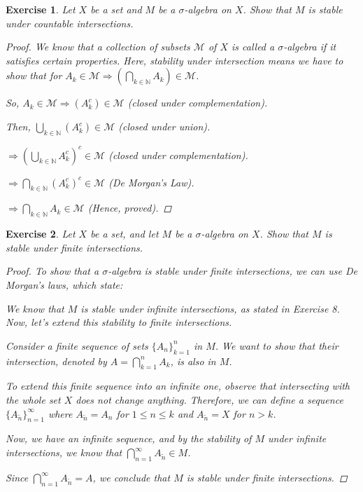 \documentclass{article}
\newtheorem{exercise}{Exercise}
\begin{document}
    \begin{exercise}
    Let $X$ be a set and $M$ be a $\sigma$-algebra on $X$. Show that $M$ is stable under countable intersections.

    \begin{proof}
        We know that a collection of subsets $\mathcal{M}$ of $X$ is called a $\sigma$-algebra if it satisfies certain properties. Here, stability under intersection means we have to show that for $A_k \in \mathcal{M} \Rightarrow \left(\bigcap_{k\in\mathbb{N}} A_k\right) \in \mathcal{M}$.

So, $A_k \in \mathcal{M} \Rightarrow (A_k^c) \in \mathcal{M}$ (closed under complementation).

Then, $\bigcup_{k\in\mathbb{N}} (A_k^c) \in \mathcal{M}$ (closed under union).

$\Rightarrow \left(\bigcup_{k\in\mathbb{N}} A_k^c\right)^c \in \mathcal{M}$ (closed under complementation).

$\Rightarrow \bigcap_{k\in\mathbb{N}} (A_k^c)^c \in \mathcal{M}$ (De Morgan's Law).

$\Rightarrow \bigcap_{k\in\mathbb{N}} A_k \in \mathcal{M}$ (Hence, proved).
    \end{proof}
        
    \end{exercise}

    \begin{exercise}
        Let $X$ be a set, and let $M$ be a $\sigma$-algebra on $X$. Show that $M$ is stable under finite intersections.

    \begin{proof}
        To show that a $\sigma$-algebra is stable under finite intersections, we can use De Morgan's laws, which state:

We know that \(M\) is stable under infinite intersections, as stated in Exercise 8. Now, let's extend this stability to finite intersections.

Consider a finite sequence of sets \(\{A_n\}_{k=1}^{n}\) in \(M\). We want to show that their intersection, denoted by \(A = \bigcap_{k=1}^{n} A_k\), is also in \(M\).

To extend this finite sequence into an infinite one, observe that intersecting with the whole set \(X\) does not change anything. Therefore, we can define a sequence \(\{A_{\tilde{n}}\}_{n=1}^{\infty}\) where \(A_{\tilde{n}} = A_n\) for \(1 \leq n \leq k\) and \(A_{\tilde{n}} = X\) for \(n > k\).

Now, we have an infinite sequence, and by the stability of \(M\) under infinite intersections, we know that \(\bigcap_{n=1}^{\infty} A_{\tilde{n}} \in M\).

Since \(\bigcap_{n=1}^{\infty} A_{\tilde{n}} = A \), we conclude that \(M\) is stable under finite intersections.


    \end{proof}
    \end{exercise}
\end{document}
